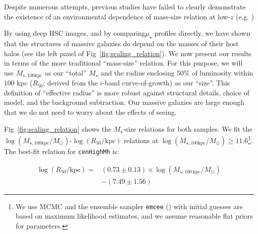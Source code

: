 \documentclass[a4paper,fleqn,usenatbib]{mnras}
\def\rbcg{\texttt{cenHighMh}}
\def\mstar{{$M_{\star}$}}
\def\mtot{{$M_{\star,100\mathrm{kpc}}$}}
\def\logmtot{{$\log (M_{\star,100\mathrm{kpc}}/M_{\odot})$}}
\def\mden{{$\mu_{\star}$}}
\begin{document}
    Despite numerous attempts, previous studies have failed to clearly 
    demonstrate the existence of an environmental dependence of mass-size relation
    at low-$z$ (e.g. \citealt{Weinmann2009, Nair2010, HCompany13, Cerbrian2014}) 
        
    
    By using deep HSC images, and by comparing\mden{} profiles directly, 
    we have shown that the structures of massive galaxies do depend on the masses of 
    their host halos (see the left panel of Fig~\ref{fig:scaling_relation}). 
    We now present our results in terms of the more traditional ``mass-size'' relation. 
    For this purpose, we will use \mtot{} as our ``total'' \mstar{} and the radius 
    enclosing 50\% of luminosity within 100 kpc ($R_{\mathrm{50}}$; derived from the 
    $i$-band curve-of-growth) as our ``size''. 
    This definition of ``effective radius'' is more robust against structural details, 
    choice of model, and the background subtraction. 
    Our massive galaxies are large enough that we do not need to worry about the 
    effects of seeing.
    
    Fig~\ref{fig:scaling_relation} shows the \mstar{}-size relations for both samples. 
    We fit the \logmtot{}-$\log (R_{\mathrm{50}}/\mathrm{kpc})$ relations at 
    \logmtot{}$\geq 11.6$\footnote{We use MCMC and the ensemble sampler 
    \texttt{emcee} (\citealt{Emcee}) with initial guesses are based on maximum 
    likelihood estimates, and we assume reasonable flat priors for parameters.}.
    The best-fit relation for \rbcg{} is:
    
    \begin{equation}
        \begin{aligned}
        \log (R_{\mathrm{50}}/\mathrm{kpc}) = & (0.73\pm0.13) \times \log (M_{\star, 100\ \mathrm{kpc}}/M_{\odot}) \\ & -(7.49\pm1.56)
        \end{aligned}
    \end{equation}
\end{document}
